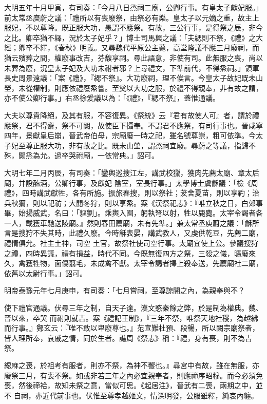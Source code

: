 \begin{pinyinscope}
 大明五年十月甲寅，有司奏：「今月八日烝祠二廟，公卿行事。有皇太子獻妃服。」前太常丞庾蔚之議：「禮所以有喪廢祭，由祭必有樂。皇太子以元嫡之重，故主上服妃，不以尊降。既正服大功，愚謂不應祭。有故，三公行事，是得祭之辰，非今之比。卿卒猶不繹，況於太子妃乎？」博士司馬興之議：「夫緦則不祭，《禮》之大經；卿卒不繹，《春秋》明義。又尋魏代平原公主薨，高堂隆議不應三月廢祠，而
 猶云殯葬之間，權廢事改吉，芬馥享祠。尋此語意，非使有司。此無服之喪，尚以未葬為廢，況皇太子妃及大功未祔者邪？上尋禮文，下準前代，不得烝祠。」領軍長史周景遠議：「案《禮》，『緦不祭』。大功廢祠，理不俟言。今皇太子故妃既未山塋，未從權制，則應依禮廢烝嘗。至奠以大功之服，於禮不得親奉，非有故之謂，亦不使公卿行事。」右丞徐爰議以為：「《禮》，『緦不祭』，蓋惟通議。



 大夫以尊貴降絕，及其有服，不容復異。《祭統》云『君有故使人可』者，謂於禮
 應祭，君不得齋，祭不可闕，故使臣下攝奉。不謂君不應祭，有司行事也。晉咸寧四年，景獻皇后崩，晉武帝伯母，宗廟廢一時之祀，雖名號尊崇，粗可依準。今太子妃至尊正服大功，非有故之比。既未山塋，謂烝祠宜廢。尋蔚之等議，指歸不殊，闕烝為允。過卒哭祔廟，一依常典。」詔可。



 大明七年二月丙辰，有司奏：「鑾輿巡搜江左，講武校獵，獲肉先薦太廟、章太后廟，并設醢酒，公卿行事，及獻妃
 陰室，室長行事。」太學博士虞龢議：「檢《周禮》，四時講武獻牲，各有所施。振旅春搜，則以祭社；茇舍夏苗，則以享礿；治兵秋獮，則以祀祊；大閱冬狩，則以享烝。案《漢祭祀志》：『唯立秋之日，白郊事畢，始揚威武，名曰：「貙劉」。乘輿入囿，躬執弩以射，牲以鹿麑。太宰令謁者各一人，載獲車馳送陵廟。』然則春田薦廟，未有先準。」兼太常丞庾蔚之議：「龢所言是搜狩不失其時，此禮久廢。今時龢表晏，講武教人，又虔供乾豆，先薦二廟，禮情俱允。社主土神，司空
 土官，故祭社使司空行事。太廟宜使上公。參議搜狩之禮，四時異議，禮有損益，時代不同。今既無復四方之祭，三殺之儀，曠廢來久，禽獲牲物，面傷翦毛，未成禽不獻。太宰令謁者擇上殺奉送，先薦廟社二廟，依舊以太尉行事。」詔可。



 明帝泰豫元年七月庚申，有司奏：「七月嘗祠，至尊諒闇之內，為親奉與不？



 使下禮官通議。伏尋三年之制，自天子達。漢文愍秦餘之弊，於是制為權典。魏、晉以來，卒哭
 而祔則就吉。案《禮記王制》，『三年不祭，唯祭天地社稷，為越紼而行事。』鄭玄云：『唯不敢以卑廢尊也。』范宣難杜預、段暢，所以闕宗廟祭者，皆人理所奉，哀戚之情，同於生者。譙周《祭志》稱：『禮，身有喪，則不為吉祭。



 緦麻之喪，於祖考有服者，則亦不祭，為神不饗也。』尋宮中有故，雖在無服，亦廢祭三月，有喪不祭。如或非若三年之內必宜親奉者，則應禘序昭穆。而今必須免喪，然後禘袷，故知未祭之意，當似可思。《起居注》，晉武有二喪，兩期之中，並不
 自祠，亦近代前事也。伏惟至尊孝越姬文，情深明發，公服雖釋，純哀內纏。




\end{pinyinscope}

